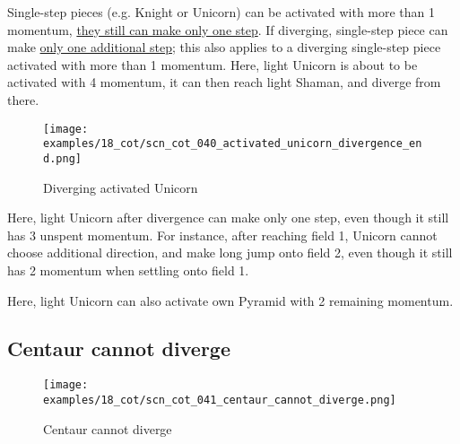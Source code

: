 \vspace*{-0.5\baselineskip}
Single-step pieces (e.g. Knight or Unicorn) can be activated with more than 1 momentum,
\hyperref[fig:scn_mv_32_single_step_piece_momentum]{they still can make only one step}.
If diverging, single-step piece can make
\hyperref[fig:scn_cot_037_diverging_unicorn_init]{only one additional step}; this also
applies to a diverging single-step piece activated with more than 1 momentum. \newline
\indent
Here, light Unicorn is about to be activated with 4 momentum, it can then reach light
Shaman, and diverge from there.

\clearpage %

\vspace*{-2.1\baselineskip}
\noindent
\begin{figure}[!h]
\texttt{[image: examples/18\_cot/scn\_cot\_040\_activated\_unicorn\_divergence\_end.png]}
\vspace*{-1.3\baselineskip}
\caption{Diverging activated Unicorn}
\label{fig:scn_cot_040_activated_unicorn_divergence_end}
\end{figure}

\vspace*{-0.4\baselineskip}
Here, light Unicorn after divergence can make only one step, even though it still
has 3 unspent momentum. For instance, after reaching field 1, Unicorn cannot choose
additional direction, and make long jump onto field 2, even though it still has 2
momentum when settling onto field 1.

Here, light Unicorn can also activate own Pyramid with 2 remaining momentum.

\clearpage %

\subsection*{Centaur cannot diverge}
\label{sec:Conquest of Tlalocan/Divergence/Centaur cannot diverge}

\vspace*{-1.4\baselineskip}
\noindent
\begin{figure}[!h]
\texttt{[image: examples/18\_cot/scn\_cot\_041\_centaur\_cannot\_diverge.png]}
\vspace*{-1.3\baselineskip}
\caption{Centaur cannot diverge}
\label{fig:scn_cot_041_centaur_cannot_diverge}
\end{figure}

